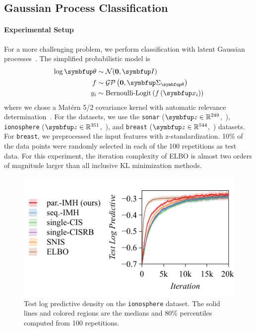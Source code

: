   \vspace{-0.05in}
\subsection{Gaussian Process Classification}\label{section:bgp}
  \vspace{-0.05in}
\paragraph{Experimental Setup}
For a more challenging problem, we perform classification with latent Gaussian processes~\citep{NIPS2014_8c6744c9}.
The simplified probabilistic model is
\begin{align*}
  \log \vtheta &\sim \mathcal{N}(\mathbf{0}, \mI) \\
   f &\sim \mathcal{GP}\left(\mathbf{0}, \mSigma_{\vtheta}\right) \\
   y_i &\sim \text{Bernoulli-Logit}\left(  f\left( \vx_i \right) \right)
\end{align*}
where we chose a Mat\'ern 5/2 covariance kernel with automatic relevance determination~\citep{neal_bayesian_1996}.
For the datasets, we use the \texttt{sonar} (\(\vz \in \mathbb{R}^{249}\),~\citealt{gorman_analysis_1988}), \texttt{ionosphere} (\(\vz \in \mathbb{R}^{351}\),~\citealt{Sigillito1989ClassificationOR}), and \texttt{breast} (\(\vz \in \mathbb{R}^{544}\),~\citealt{wolberg_multisurface_1990}) datasets.
For \texttt{breast}, we preprocessed the input features with z-standardization.
10\% of the data points were randomly selected in each of the 100 repetitions as test data.
For this experiment, the iteration complexity of ELBO is almost two orders of magnitude larger than all inclusive KL minimization methods.

%
\begin{figure}[H]
  \centering
     \includegraphics[scale=0.8]{figures/ionosphere_01.pdf}
     \vspace{-0.1in}
  \caption{Test log predictive density on the \texttt{ionosphere} dataset.
    The solid lines and colored regions are the medians and 80\% percentiles computed from 100 repetitions.
  }\label{fig:gp}
  \vspace{-0.1in}
\end{figure}
%
\vspace{-0.05in}
